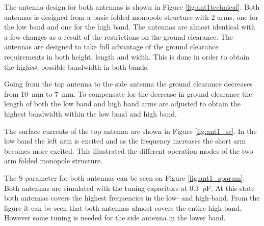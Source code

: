 The antenna design for both antennas is shown in Figure \ref{fig:ant1technical}. Both antennas is designed from a basic folded monopole structure with 2 arms, one for the low band and one for the high band. The antennas are almost identical with a few changes as a result of the restrictions on the ground clearance.
The antennas are designed to take full advantage of the ground clearance requirements in both height, length and width. This is done in order to obtain the highest possible bandwidth in both bands. 

Going from the top antenna to the side antenna the ground clearance decreases from \SI{10}{mm} to \SI{7}{mm}. To compensate for the decrease in ground clearance the length of both the low band and high band arms are adjusted to obtain the highest bandwidth within the low band and high band. 

The surface currents of the top antenna are shown in Figure \ref{fig:ant1_sc}. In the low band the left arm is excited and as the frequency increases the short arm becomes more excited. This illustrated the different operation modes of the two arm folded monopole structure.

The S-parameter for both antennas can be seen on Figure \ref{fig:ant1_sparam}. Both antennas are simulated with the tuning capacitors at \SI{0.3}{pF}. At this state both antennas covers the highest frequencies in the low- and high-band. From the figure it can be seen that both antennas almost covers the entire high band. However some tuning is needed for the side antenna in the lower band.   

